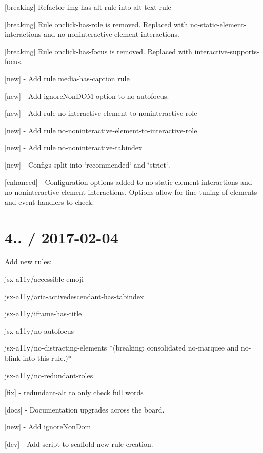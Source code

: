 \begin{DoxyItemize}
\item \mbox{[}breaking\mbox{]} Refactor {\ttfamily img-\/has-\/alt} rule into {\ttfamily alt-\/text} rule
\item \mbox{[}breaking\mbox{]} Rule {\ttfamily onclick-\/has-\/role} is removed. Replaced with {\ttfamily no-\/static-\/element-\/interactions} and {\ttfamily no-\/noninteractive-\/element-\/interactions}.
\item \mbox{[}breaking\mbox{]} Rule {\ttfamily onclick-\/has-\/focus} is removed. Replaced with {\ttfamily interactive-\/supports-\/focus}.
\item \mbox{[}new\mbox{]} -\/ Add rule {\ttfamily media-\/has-\/caption} rule
\item \mbox{[}new\mbox{]} -\/ Add {\ttfamily ignore\+Non\+D\+OM} option to {\ttfamily no-\/autofocus}.
\item \mbox{[}new\mbox{]} -\/ Add rule {\ttfamily no-\/interactive-\/element-\/to-\/noninteractive-\/role}
\item \mbox{[}new\mbox{]} -\/ Add rule {\ttfamily no-\/noninteractive-\/element-\/to-\/interactive-\/role}
\item \mbox{[}new\mbox{]} -\/ Add rule {\ttfamily no-\/noninteractive-\/tabindex}
\item \mbox{[}new\mbox{]} -\/ Configs split into \char`\"{}recommended\char`\"{} and \char`\"{}strict\char`\"{}.
\item \mbox{[}enhanced\mbox{]} -\/ Configuration options added to {\ttfamily no-\/static-\/element-\/interactions} and {\ttfamily no-\/noninteractive-\/element-\/interactions}. Options allow for fine-\/tuning of elements and event handlers to check.
\end{DoxyItemize}

\section*{4.. / 2017-\/02-\/04 }

Add new rules\+:
\begin{DoxyItemize}
\item {\ttfamily jsx-\/a11y/accessible-\/emoji}
\item {\ttfamily jsx-\/a11y/aria-\/activedescendant-\/has-\/tabindex}
\item {\ttfamily jsx-\/a11y/iframe-\/has-\/title}
\item {\ttfamily jsx-\/a11y/no-\/autofocus}
\item {\ttfamily jsx-\/a11y/no-\/distracting-\/elements} $\ast$(breaking\+: consolidated no-\/marquee and no-\/blink into this rule.)$\ast$
\item {\ttfamily jsx-\/a11y/no-\/redundant-\/roles}
\item \mbox{[}fix\mbox{]} -\/ redundant-\/alt to only check full words
\item \mbox{[}docs\mbox{]} -\/ Documentation upgrades across the board.
\item \mbox{[}new\mbox{]} -\/ Add {\ttfamily ignore\+Non\+Dom}
\item \mbox{[}dev\mbox{]} -\/ Add script to scaffold new rule creation.
\end{DoxyItemize}

